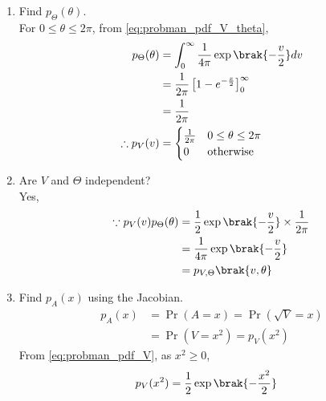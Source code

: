 \begin{enumerate}[label=\thesubsection.\arabic*.,ref=\thesubsection.\theenumi]
\item
Find $p_{\Theta}(\theta)$.  
\\
\solution For $0 \le \theta \le 2\pi$, from \eqref{eq:probman_pdf_V_theta},
\begin{align}
p_{\Theta}(\theta) &= \int_{0}^{\infty} \frac{1}{4\pi}\exp\brak{-\frac{v}{2}} d v \\
&= \frac{1}{2\pi} \left[1 - e^{-\frac{x}{2}} \right]_{0}^{\infty}\\
&= \frac{1}{2\pi}\\
\therefore p_{V}(v) &= 
\begin{cases}
\frac{1}{2\pi} & 0 \leq \theta \leq 2\pi \\
0 & \text{otherwise}
\end{cases}
\end{align}
%
\item
Are $V$ and $\Theta$ independent?
\\
\solution Yes,
\begin{align}
\because p_{V}(v)p_{\Theta}(\theta) &= \frac{1}{2}\exp\brak{-\frac{v}{2}} \times \frac{1}{2\pi}\\
&= \frac{1}{4\pi}\exp\brak{-\frac{v}{2}}\\
&= p_{V,\Theta}\brak{v,\theta}
\end{align}
\item
Find $p_{A}(x)$ using the Jacobian.
\\
\solution 
\begin{align}
p_{A}(x) &= \Pr(A=x) = \Pr(\sqrt{V} = x) \\
&= \Pr(V=x^2) = p_V(x^2)
\end{align}
From \eqref{eq:probman_pdf_V}, as $x^2 \ge 0$,
\begin{align}
p_{V}(x^2) &= \frac{1}{2}\exp\brak{-\frac{x^2}{2}} 
\end{align}




%
%

%
%
%
\end{enumerate}
